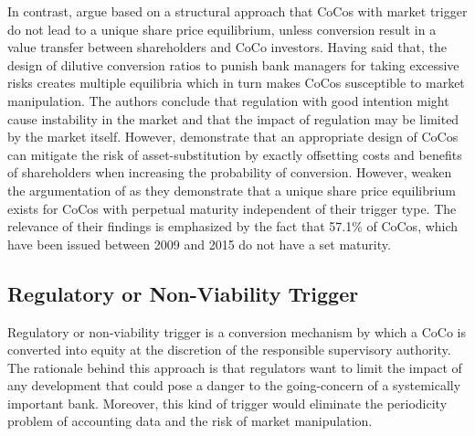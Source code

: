 In contrast, \citet{sundaresan2015design} argue based on a structural approach that CoCos with market trigger do not lead to a unique share price equilibrium, unless conversion result in a value transfer  between shareholders and CoCo investors. Having said that, the design of dilutive conversion ratios to punish bank managers for taking excessive risks creates multiple equilibria which in turn makes CoCos susceptible to market manipulation. The authors conclude that regulation with good intention might cause instability in the market and that the impact of regulation may be limited by the market itself. However, \citet{hilscher2014bank} demonstrate that an appropriate design of CoCos can mitigate the risk of asset-substitution by exactly offsetting costs and benefits of shareholders when increasing the probability of conversion. However, \citet{pennacchi2015reexamination} weaken the argumentation of \citet{sundaresan2015design} as they demonstrate that a unique share price equilibrium exists for CoCos with perpetual maturity independent of their trigger type. The relevance of their findings is emphasized by the fact that 57.1\% of CoCos, which have been issued between 2009 and 2015 do not have a set maturity. \citep{europeanparliament2016}


\subsection{Regulatory or Non-Viability Trigger} \label{regulatorytrigger}

Regulatory or non-viability trigger is a conversion mechanism by which a CoCo is converted into equity at the discretion of the responsible supervisory authority. The rationale behind this approach is that regulators want to limit the impact of any development that could pose a danger to the going-concern of a systemically important bank. \citep{erismann2015pricing} Moreover, this kind of trigger would eliminate the periodicity problem of accounting data and the risk of market manipulation.\\ 

